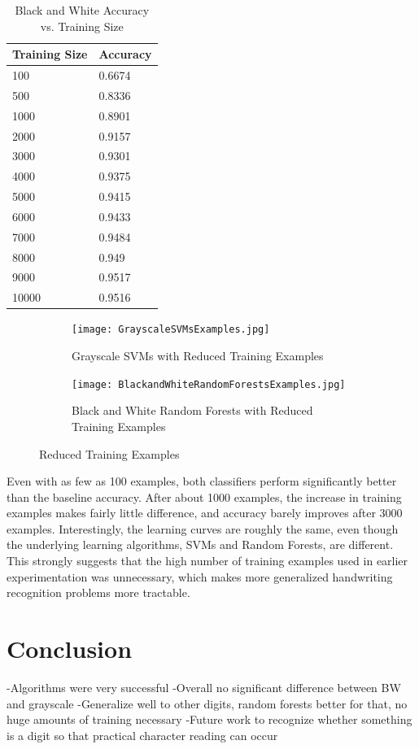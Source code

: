 \documentclass[12pt]{article}
\begin{document}
\begin{table}[H]
\centering
\caption{Black and White Accuracy vs. Training Size}
    \begin{tabular}{|l|l|}
    \hline
    Training Size & Accuracy \\ \hline
    100      & 0.6674   \\ \hline
    500      & 0.8336   \\ \hline
    1000      & 0.8901   \\ \hline
    2000      & 0.9157   \\ \hline
    3000      & 0.9301   \\ \hline
    4000      & 0.9375   \\ \hline
    5000      & 0.9415   \\ \hline
    6000      & 0.9433   \\ \hline
    7000      & 0.9484   \\ \hline
    8000      & 0.949   \\ \hline
    9000      & 0.9517   \\ \hline
    10000      & 0.9516   \\ \hline
    \end{tabular}
\end{table}

\begin{figure}[H]
\centering
\begin{subfigure}{.45\textwidth}
  \centering
  \texttt{[image: GrayscaleSVMsExamples.jpg]}
  \caption{Grayscale SVMs with Reduced Training Examples}
  \label{fig:sub1}
\end{subfigure}%
\hspace{2mm}
\begin{subfigure}{.45\textwidth}
  \centering
  \texttt{[image: BlackandWhiteRandomForestsExamples.jpg]}
  \caption{Black and White Random Forests with Reduced Training Examples}
  \label{fig:sub2}
\end{subfigure}
\caption{Reduced Training Examples}
\label{fig:test}
\end{figure}

Even with as few as 100 examples, both classifiers perform significantly better than the baseline accuracy. After about 1000 examples, the increase in training examples makes fairly little difference, and accuracy barely improves after 3000 examples. Interestingly, the learning curves are roughly the same, even though the underlying learning algorithms, SVMs and Random Forests, are different. This strongly suggests that the high number of training examples used in earlier experimentation was unnecessary, which makes more generalized handwriting recognition problems more tractable. 

\section*{Conclusion}
-Algorithms were very successful
-Overall no significant difference between BW and grayscale
-Generalize well to other digits, random forests better for that, no huge amounts of training necessary
-Future work to recognize whether something is a digit so that practical character reading can occur
\end{document}
